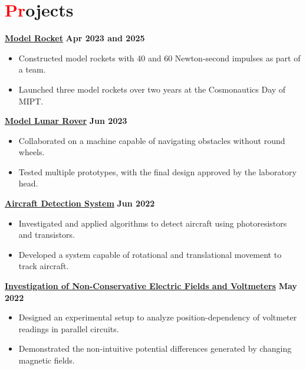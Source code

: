 \documentclass[a4paper, 11pt]{article}
\begin{document}
\section{{\textcolor{red}{Pr}ojects}}
    {\href{https://github.com/icarus-imperium/rocket-2025}{\textbf{Model Rocket}}} \hfill \textbf{Apr 2023 and 2025} \\
    \begin{itemize}
        \vspace{-9pt}
    \item Constructed model rockets with 40 and 60 Newton-second impulses as part of a team.
        \vspace{-9pt}
    \item  Launched three model rockets over two years at the Cosmonautics Day of MIPT.
    \end{itemize}
    \vspace{-9pt}
    {\href{https://github.com/rezaaliasgarirenani/Rover}{\textbf{Model Lunar Rover}}} \hfill \textbf{Jun 2023}
    \begin{itemize}
        \vspace{-9pt}
    \item  Collaborated on a machine capable of navigating obstacles without round wheels.
        \vspace{-9pt}
    \item  Tested multiple prototypes, with the final design approved by the laboratory head.
    \end{itemize}
    \vspace{-9pt}
    {\href{https://github.com/rezaaliasgarirenani/Aircraft-Detection-System}{\textbf{Aircraft Detection System}}} \hfill \textbf{Jun 2022}
    \begin{itemize}
        \vspace{-9pt}
    \item  Investigated and applied algorithms to detect aircraft using photoresistors and transistors.
        \vspace{-9pt}
    \item  Developed a system capable of rotational and translational movement to track aircraft.
    \end{itemize}
    \vspace{-9pt}
    {\href{https://github.com/rezaaliasgarirenani/Non-Conservative-Electric-Fields-and-Voltmeters}{\textbf{Investigation of Non-Conservative Electric Fields and Voltmeters}}} \hfill \textbf{May 2022} \\
    \begin{itemize}
        \vspace{-9pt}
    \item  Designed an experimental setup to analyze position-dependency of voltmeter readings in parallel circuits.
        \vspace{-9pt}
    \item  Demonstrated the non-intuitive potential differences generated by changing magnetic fields.
    \end{itemize}
    \vspace{-15pt}
\end{document}
